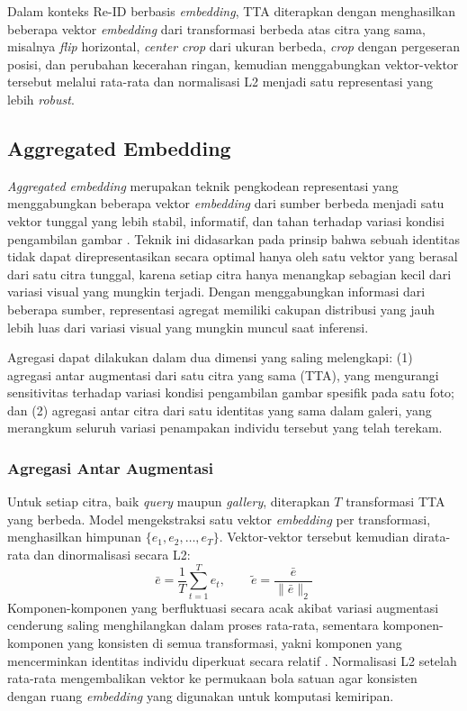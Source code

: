 Dalam konteks Re-ID berbasis \textit{embedding}, TTA diterapkan dengan menghasilkan beberapa vektor \textit{embedding} dari transformasi berbeda atas citra yang sama, misalnya \textit{flip} horizontal, \textit{center crop} dari ukuran berbeda, \textit{crop} dengan pergeseran posisi, dan perubahan kecerahan ringan, kemudian menggabungkan vektor-vektor tersebut melalui rata-rata dan normalisasi L2 menjadi satu representasi yang lebih \textit{robust}.

\subsection{Aggregated Embedding}
\textit{Aggregated embedding} merupakan teknik pengkodean representasi yang menggabungkan beberapa vektor \textit{embedding} dari sumber berbeda menjadi satu vektor tunggal yang lebih stabil, informatif, dan tahan terhadap variasi kondisi pengambilan gambar \cite{zhong2017reranking}. Teknik ini didasarkan pada prinsip bahwa sebuah identitas tidak dapat direpresentasikan secara optimal hanya oleh satu vektor yang berasal dari satu citra tunggal, karena setiap citra hanya menangkap sebagian kecil dari variasi visual yang mungkin terjadi. Dengan menggabungkan informasi dari beberapa sumber, representasi agregat memiliki cakupan distribusi yang jauh lebih luas dari variasi visual yang mungkin muncul saat inferensi.
 
Agregasi dapat dilakukan dalam dua dimensi yang saling melengkapi: (1) agregasi antar augmentasi dari satu citra yang sama (TTA), yang mengurangi sensitivitas terhadap variasi kondisi pengambilan gambar spesifik pada satu foto; dan (2) agregasi antar citra dari satu identitas yang sama dalam galeri, yang merangkum seluruh variasi penampakan individu tersebut yang telah terekam.
 
\subsubsection{Agregasi Antar Augmentasi}
 
Untuk setiap citra, baik \textit{query} maupun \textit{gallery}, diterapkan $T$ transformasi TTA yang berbeda. Model mengekstraksi satu vektor \textit{embedding} per transformasi, menghasilkan himpunan $\{e_1, e_2, \ldots, e_T\}$. Vektor-vektor tersebut kemudian dirata-rata dan dinormalisasi secara L2:
\begin{equation}
    \bar{e} = \frac{1}{T} \sum_{t=1}^{T} e_t,
    \qquad
    \tilde{e} = \frac{\bar{e}}{\|\bar{e}\|_2}
\end{equation}
Komponen-komponen yang berfluktuasi secara acak akibat variasi augmentasi cenderung saling menghilangkan dalam proses rata-rata, sementara komponen-komponen yang konsisten di semua transformasi, yakni komponen yang mencerminkan identitas individu diperkuat secara relatif \cite{kim2020testa}. Normalisasi L2 setelah rata-rata mengembalikan vektor ke permukaan bola satuan agar konsisten dengan ruang \textit{embedding} yang digunakan untuk komputasi kemiripan.
 
